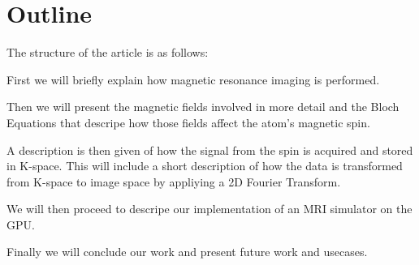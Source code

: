



\section{Outline}

The structure of the article is as follows:

First we will briefly explain how magnetic resonance imaging is
performed.

Then we will present the magnetic fields involved in more detail and
the Bloch Equations that descripe how those fields affect the atom's
magnetic spin.

A description is then given of how the signal from the spin is
acquired and stored in K-space. This will include a short description
of how the data is transformed from K-space to image space by
appliying a 2D Fourier Transform.

We will then proceed to descripe our implementation of an MRI
simulator on the GPU.

Finally we will conclude our work and present future work and
usecases.

